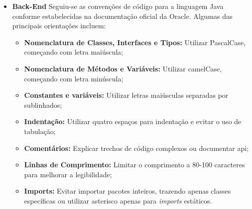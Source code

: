 \begin{itemize}
    \item \textbf{Back-End}
     Seguiu-se as convenções de código  para a linguagem Java conforme estabelecidas na documentação oficial da Oracle. Algumas das principais orientações incluem:
     \begin{itemize}
        \item \textbf{Nomenclatura de Classes, Interfaces e Tipos:}
        Utilizar PascalCase, começando com letra maiúscula;
        \item \textbf{Nomenclatura de Métodos e Variáveis:}
        Utilizar camelCase, começando com letra minúscula;
        \item \textbf{Constantes e variáveis:}
        Utilizar letras maiúsculas separadas por sublinhados;
        \item \textbf{Indentação:}
        Utilizar quatro espaços para indentação e evitar o uso de tabulação;
        \item \textbf{Comentários:}
        Explicar trechos de código complexos ou documentar \ac{api};
        \item \textbf{Linhas de Comprimento:}
         Limitar o comprimento a 80-100 caracteres para melhorar a legibilidade;
        \item \textbf{Imports:}
        Evitar importar pacotes inteiros, trazendo apenas classes específicas ou utilizar asterisco apenas para \textit{imports} estáticos.
     \end{itemize}
\end{itemize}
